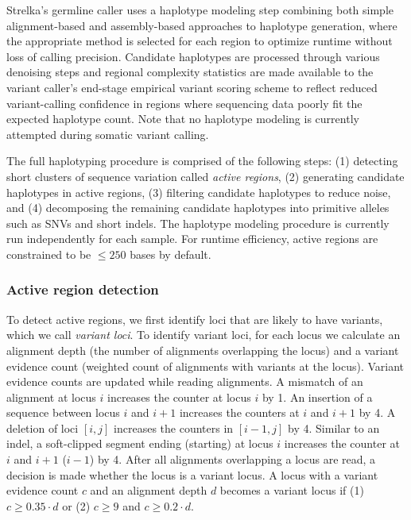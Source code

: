\documentclass{article}
\begin{document}
Strelka's germline caller uses a haplotype modeling step combining both simple alignment-based and assembly-based approaches to haplotype generation, where the appropriate method is selected for each region to optimize runtime without loss of calling precision. Candidate haplotypes are processed through various denoising steps and regional complexity statistics are made available to the variant caller's end-stage empirical variant scoring scheme to reflect reduced variant-calling confidence in regions where sequencing data poorly fit the expected haplotype count. Note that no haplotype modeling is currently attempted during somatic variant calling.

The full haplotyping procedure is comprised of the following steps: (1) detecting short clusters of sequence variation called {\em active regions}, (2) generating candidate haplotypes in active regions, (3) filtering candidate haplotypes to reduce noise, and (4) decomposing the remaining candidate haplotypes into primitive alleles such as SNVs and short indels. The haplotype modeling procedure is currently run independently for each sample. For runtime efficiency, active regions are constrained to be $\leq 250$ bases by default.


\subsubsection{Active region detection}
To detect active regions, we first identify loci that are likely to have variants, which we call {\em variant loci}. To identify variant loci, for each locus we calculate an alignment depth (the number of alignments overlapping the locus) and a variant evidence count (weighted count of alignments with variants at the locus). Variant evidence counts are updated while reading alignments. A mismatch of an alignment at locus $i$ increases the counter at locus $i$ by 1. An insertion of a sequence between locus $i$ and $i+1$ increases the counters at $i$ and $i+1$ by 4. A deletion of loci $[i,j]$ increases the counters in $[i-1,j]$ by 4. Similar to an indel, a soft-clipped segment ending (starting) at locus $i$ increases the counter at $i$ and $i+1$ ($i-1$) by 4. After all alignments overlapping a locus are read, a decision is made whether the locus is a variant locus. A locus with a variant evidence count $c$ and an alignment depth $d$ becomes a variant locus if (1) $c \geq 0.35 \cdot d$ or (2) $c \geq 9$ and $c \geq 0.2 \cdot d$.
\end{document}
